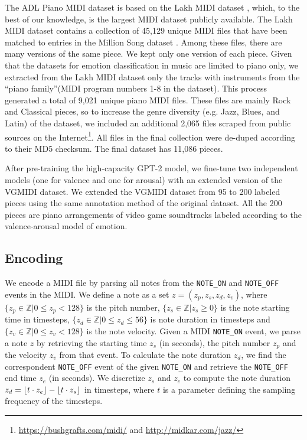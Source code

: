 The ADL Piano MIDI dataset is based on the Lakh MIDI dataset \cite{raffel2016learning}, which, to the best of our knowledge,
is the largest MIDI dataset publicly available. The Lakh MIDI dataset contains a collection of 45,129 unique MIDI files that
have been matched to entries in the Million Song dataset \cite{bertin2011million}. Among these files, there are many versions of the same piece. We kept only one version of each piece. Given that the datasets for emotion classification in music are limited to piano only, we extracted from the Lakh MIDI dataset only the tracks with instruments from the ``piano family''(MIDI program numbers 1-8 in the dataset).
This process generated a total of 9,021 unique piano MIDI files. These files are mainly Rock and Classical pieces, so to increase the genre diversity (e.g. Jazz, Blues, and Latin) of the dataset, we
included an additional 2,065 files scraped from public sources on the Internet\footnote{\url{https://bushgrafts.com/midi/} and \url{http://midkar.com/jazz/}}. All files in the final collection were de-duped according to their MD5 checksum. The final dataset has 11,086 pieces.

After pre-training the high-capacity GPT-2 model, we
fine-tune two independent models (one for valence and one for arousal) with an extended version of the VGMIDI dataset\cite{ferreira_2019}.
We extended the VGMIDI dataset from 95 to 200 labeled pieces using the same annotation method of the original dataset.
All the 200 pieces are piano arrangements of video game soundtracks labeled according to the valence-arousal model of emotion.

\subsection{Encoding}

We encode a MIDI file by parsing all notes from the
\texttt{NOTE\_ON} and \texttt{NOTE\_OFF}
events in the MIDI. We define a note as a set $z = (z_p, z_s, z_d, z_v)$,
where $\{z_p \in \mathbb{Z} \vert 0 \leq z_p < 128 \}$ is the
pitch number, $\{z_s \in \mathbb{Z} \vert z_s \geq 0 \}$ is the note starting time
in timesteps,  $\{z_d \in \mathbb{Z} \vert 0 \leq z_d \leq 56\}$ is note duration
in timesteps and $\{z_v \in \mathbb{Z} \vert 0 \leq z_v < 128 \}$ is the
note velocity.
Given a MIDI \texttt{NOTE\_ON} event, we parse a note $z$ by retrieving
the starting time $z_s$ (in seconds), the pitch number $z_p$ and
the velocity $z_v$ from that event. To calculate the note duration
$z_d$, we find the correspondent \texttt{NOTE\_OFF} event of the given \texttt{NOTE\_ON}
and retrieve the \texttt{NOTE\_OFF} end time $z_e$ (in seconds). We discretize
$z_s$ and $z_e$ to compute the note duration $z_d = \lfloor t \cdot z_e\rfloor - \lfloor t \cdot z_s\rfloor$ in timesteps, where $t$ is a parameter defining
the sampling frequency of the timesteps.

